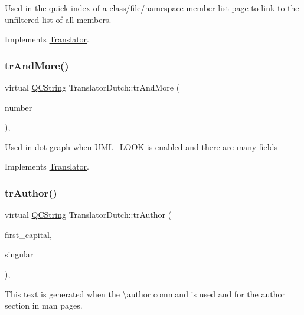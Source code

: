 Used in the quick index of a class/file/namespace member list page to link to the unfiltered list of all members. 

Implements \mbox{\hyperlink{class_translator}{Translator}}.

\mbox{\label{class_translator_dutch_ab75e4abf688b919d1e4d591609d8a687}} 
\subsubsection{\texorpdfstring{trAndMore()}{trAndMore()}}
{\footnotesize\ttfamily virtual \mbox{\hyperlink{class_q_c_string}{Q\+C\+String}} Translator\+Dutch\+::tr\+And\+More (\begin{DoxyParamCaption}\item[{const \mbox{\hyperlink{class_q_c_string}{Q\+C\+String}} \&}]{number }\end{DoxyParamCaption})\hspace{0.3cm}{\ttfamily [inline]}, {\ttfamily [virtual]}}

Used in dot graph when U\+M\+L\+\_\+\+L\+O\+OK is enabled and there are many fields 

Implements \mbox{\hyperlink{class_translator}{Translator}}.

\mbox{\label{class_translator_dutch_a12714f2eb503c562abbfa75864801fc2}} 
\subsubsection{\texorpdfstring{trAuthor()}{trAuthor()}}
{\footnotesize\ttfamily virtual \mbox{\hyperlink{class_q_c_string}{Q\+C\+String}} Translator\+Dutch\+::tr\+Author (\begin{DoxyParamCaption}\item[{bool}]{first\+\_\+capital,  }\item[{bool}]{singular }\end{DoxyParamCaption})\hspace{0.3cm}{\ttfamily [inline]}, {\ttfamily [virtual]}}

This text is generated when the \textbackslash{}author command is used and for the author section in man pages. 

